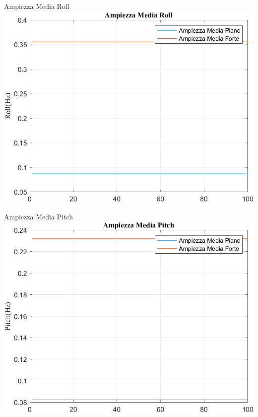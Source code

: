	
	
	\begin{frame}{{Ampiezza Media Roll}}
		\centering\includegraphics[height=.8\textheight]{figure/VAng/Trasformata/Ampiezza MediaRoll}
	\end{frame}
	
	\begin{frame}{{Ampiezza Media Pitch}}
		\centering\includegraphics[height=.8\textheight]{figure/VAng/Trasformata/Ampiezza MediaPitch}
	\end{frame}
	
